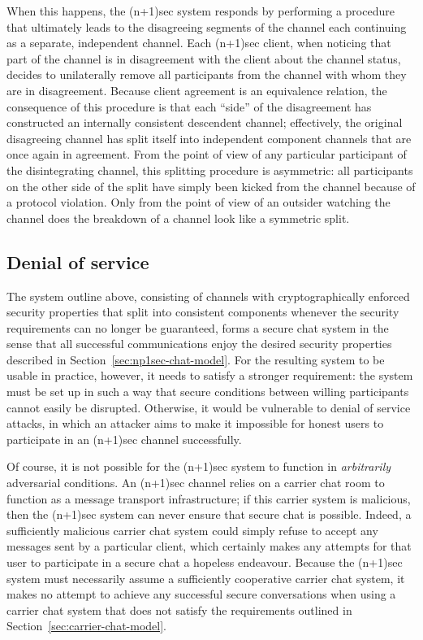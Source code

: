 \documentclass{article}
\begin{document}
When this happens, the (n+1)sec system responds by performing a procedure that ultimately leads to the disagreeing segments of the channel each continuing as a separate, independent channel.
Each (n+1)sec client, when noticing that part of the channel is in disagreement with the client about the channel status, decides to unilaterally remove all participants from the channel with whom they are in disagreement.
Because client agreement is an equivalence relation, the consequence of this procedure is that each ``side'' of the disagreement has constructed an internally consistent descendent channel; effectively, the original disagreeing channel has split itself into independent component channels that are once again in agreement.
From the point of view of any particular participant of the disintegrating channel, this splitting procedure is asymmetric: all participants on the other side of the split have simply been kicked from the channel because of a protocol violation.
Only from the point of view of an outsider watching the channel does the breakdown of a channel look like a symmetric split.

\subsection{Denial of service}
The system outline above, consisting of channels with cryptographically enforced security properties that split into consistent components whenever the security requirements can no longer be guaranteed, forms a secure chat system in the sense that all successful communications enjoy the desired security properties described in Section~\ref{sec:np1sec-chat-model}.
For the resulting system to be usable in practice, however, it needs to satisfy a stronger requirement: the system must be set up in such a way that secure conditions between willing participants cannot easily be disrupted.
Otherwise, it would be vulnerable to denial of service attacks, in which an attacker aims to make it impossible for honest users to participate in an (n+1)sec channel successfully.

Of course, it is not possible for the (n+1)sec system to function in \emph{arbitrarily} adversarial conditions.
An (n+1)sec channel relies on a carrier chat room to function as a message transport infrastructure; if this carrier system is malicious, then the (n+1)sec system can never ensure that secure chat is possible.
Indeed, a sufficiently malicious carrier chat system could simply refuse to accept any messages sent by a particular client, which certainly makes any attempts for that user to participate in a secure chat a hopeless endeavour.
Because the (n+1)sec system must necessarily assume a sufficiently cooperative carrier chat system, it makes no attempt to achieve any successful secure conversations when using a carrier chat system that does not satisfy the requirements outlined in Section~\ref{sec:carrier-chat-model}.
\end{document}
